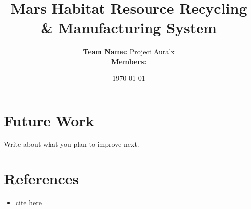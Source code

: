 \documentclass[12pt, a4paper]{article}
\title{\textbf{Mars Habitat Resource Recycling \& Manufacturing System}}
\author{%
    \textbf{Team Name:} Project Aura'x \\[0.3em]
    \textbf{Members:} 
}
\date{\today}
\begin{document}
\maketitle

\section{Future Work}
Write about what you plan to improve next.

\section*{References}
\begin{itemize}
    \item cite here 
\end{itemize}
\end{document}
